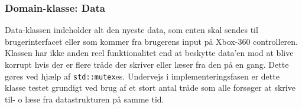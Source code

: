 \subsubsection{Domain-klasse: Data} \label{sec:data_klasse}

Data-klassen indeholder alt den nyeste data, som enten skal sendes til brugerinterfacet eller som kommer fra brugerens input på Xbox-360 controlleren. Klassen har ikke anden reel funktionalitet end at beskytte data'en mod at blive korrupt hvis der er flere tråde der skriver eller læser fra den på en gang. Dette gøres ved hjælp af \texttt{std::mutex}es. Undervejs i implementeringsfasen er dette klasse testet grundigt ved brug af et stort antal tråde som alle forsøger at skrive til- o læse fra datastrukturen på samme tid.
